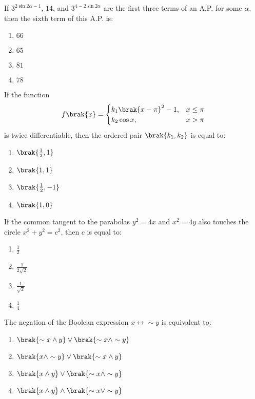 \iffalse
    \title{5th September 2020 Shift 1}  
    \author{AI24BTECH11015}
    \section{mcq-single}
\fi
    \item If $3 ^ {2 \sin 2\alpha - 1}$, $14$, and $3 ^ {4 - 2 \sin 2\alpha}$ are the first three terms of an A.P. for some $\alpha$, then the sixth term of this A.P. is:
    \begin{enumerate}
        \item $66$
        \item $65$
        \item $81$
        \item $78$
    \end{enumerate}

    \item If the function 
    \begin{equation*}
    f\brak{x} = 
    \begin{cases}
    k_1 \brak{x-\pi}^2 -1, & x \leq \pi \\
    k_2 \cos x, & x > \pi
    \end{cases}
    \end{equation*}
    is twice differentiable, then the ordered pair $\brak{k_1, k_2}$ is equal to:
    \begin{enumerate}
        \item $\brak{\frac{1}{2}, 1}$
        \item $\brak{1, 1}$
        \item $\brak{\frac{1}{2}, -1}$
        \item $\brak{1, 0}$
    \end{enumerate}

    \item If the common tangent to the parabolas $y^2 = 4x$ and $x^2 = 4y$ also touches the circle $x^2 + y^2 = c^2$, then $c$ is equal to:
    \begin{enumerate}
        \item $\frac{1}{2}$
        \item $\frac{1}{2\sqrt{2}}$
        \item $\frac{1}{\sqrt{2}}$
        \item $\frac{1}{4}$
    \end{enumerate}

    \item The negation of the Boolean expression $x \leftrightarrow \sim y$ is equivalent to:
    \begin{enumerate}
        \item $\brak{\sim x \land y} \lor \brak{\sim x \land \sim y}$
        \item $\brak{x \land \sim y} \lor \brak{\sim x \land y}$
        \item $\brak{x \land y} \lor \brak{\sim x \land \sim y}$
        \item $\brak{x \land y} \land \brak{\sim x \lor \sim y}$
    \end{enumerate}

